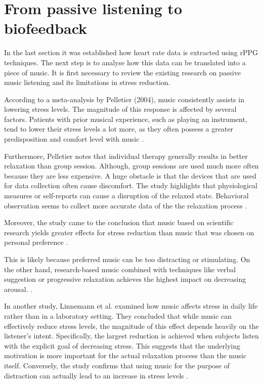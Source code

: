 \section{From passive listening to biofeedback}

In the last section it was established how heart rate data is extracted using rPPG techniques. The next step is to analyse how this data can be translated into a piece of music. It is first necessary to review the existing research on passive music listening and its limitations in stress reduction.

According to a meta-analysis by Pelletier (2004), music consistently assists in lowering stress levels. The magnitude of this response is affected by several factors. Patients with prior musical experience, such as playing an instrument, tend to lower their stress levels a lot more, as they often possess a greater predisposition and comfort level with music \cite{pelletier2004effect}.

Furthermore, Pelletier notes that individual therapy generally results in better relaxation than group session. Although, group sessions are used much more often because they are less expensive. A huge obstacle is that the devices that are used for data collection often cause discomfort. The study highlights that physiological measures or self-reports can cause a disruption of the relaxed state. Behavioral observation seems to collect more accurate data of the the relaxation process  \cite{pelletier2004effect}.

Moreover, the study came to the conclusion that music based on scientific research yields greater effects for stress reduction than music that was chosen on personal preference  \cite{pelletier2004effect}.

This is likely because preferred music can be too distracting or stimulating. On the other hand, research-based music combined with techniques like verbal suggestion or progressive relaxation achieves the highest impact on decreasing arousal. \cite{pelletier2004effect}.

In another study, Linnemann et al. examined how music affects stress in daily life rather than in a laboratory setting. They concluded that while music can effectively reduce stress levels, the magnitude of this effect depends heavily on the listener's intent. Specifically, the largest reduction is achieved when subjects listen with the explicit goal of decreasing stress. This suggests that the underlying motivation is more important for the actual relaxation process than the music itself. Conversely, the study confirms that using music for the purpose of distraction can actually lead to an increase in stress levels \cite{linnemann2015music}.


